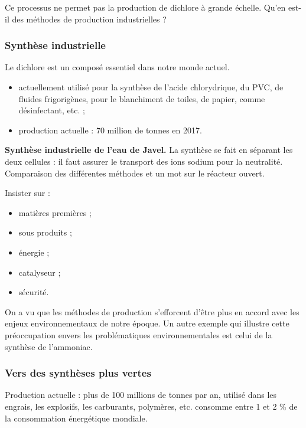 \begin{transition}
Ce processus ne permet pas la production de dichlore à grande échelle.
Qu'en est-il des méthodes de production industrielles ?
\end{transition}

\subsubsection{Synthèse industrielle}

Le dichlore est un composé essentiel dans notre monde actuel.
\begin{itemize}
\item actuellement utilisé pour la synthèse de l'acide chlorydrique, du PVC, de fluides frigorigènes, pour le blanchiment de toiles, de papier, comme désinfectant, etc. ;
\item production actuelle : $70$ million de tonnes en 2017.
\end{itemize}

\begin{slide}
\textbf{Synthèse industrielle de l'eau de Javel.}
La synthèse se fait en séparant les deux cellules : il faut assurer le transport des ions sodium pour la neutralité.
Comparaison des différentes méthodes et un mot sur le réacteur ouvert.
\end{slide}

Insister sur :
\begin{itemize}
\item matières premières ;
\item sous produits ;
\item énergie ;
\item catalyseur ;
\item sécurité.
\end{itemize}

\begin{transition}
On a vu que les méthodes de production s'efforcent d'être plus en accord avec les enjeux environnementaux de notre époque.
Un autre exemple qui illustre cette préoccupation envers les problématiques environnementales est celui de la synthèse de l'ammoniac.
\end{transition}

\subsubsection{Vers des synthèses plus vertes}

Production actuelle : plus de 100 millions de tonnes par an, utilisé dans les engrais, les explosifs, les carburants, polymères, etc. consomme entre 1 et 2 \% de la consommation énergétique mondiale.

